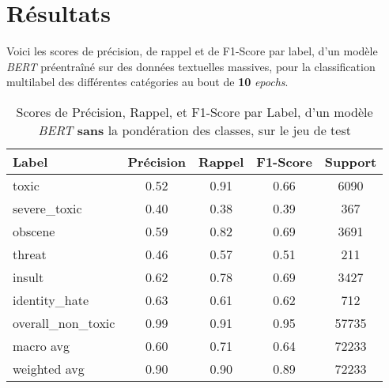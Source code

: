\section{Résultats}

Voici les scores de précision, de rappel et de F1-Score par label, d'un modèle \textit{BERT} préentraîné sur des données textuelles massives, pour la classification multilabel des différentes catégories au bout de \textbf{10} \textit{epochs}.

\begin{table}[ht]
    \centering
    \caption{Scores de Précision, Rappel, et F1-Score par Label, d'un modèle \textit{BERT} \textbf{sans} la pondération des classes, sur le jeu de test}    \begin{tabular}{lcccc}
    \hline
    \textbf{Label} & \textbf{Précision} & \textbf{Rappel} & \textbf{F1-Score} & \textbf{Support} \\ \hline
    toxic          & 0.52               & 0.91            & 0.66              & 6090             \\
    severe\_toxic  & 0.40               & 0.38            & 0.39              & 367              \\
    obscene        & 0.59               & 0.82            & 0.69              & 3691             \\
    threat         & 0.46               & 0.57            & 0.51              & 211              \\
    insult         & 0.62               & 0.78            & 0.69              & 3427             \\
    identity\_hate & 0.63               & 0.61            & 0.62              & 712              \\
    overall\_non\_toxic & 0.99           & 0.91            & 0.95              & 57735            \\\hline
    macro avg      & 0.60              & 0.71            & 0.64              & 72233            \\
    weighted avg   & 0.90               & 0.90            & 0.89             & 72233            \\ \hline
    \end{tabular}
    \label{tab:scores}
\end{table}



